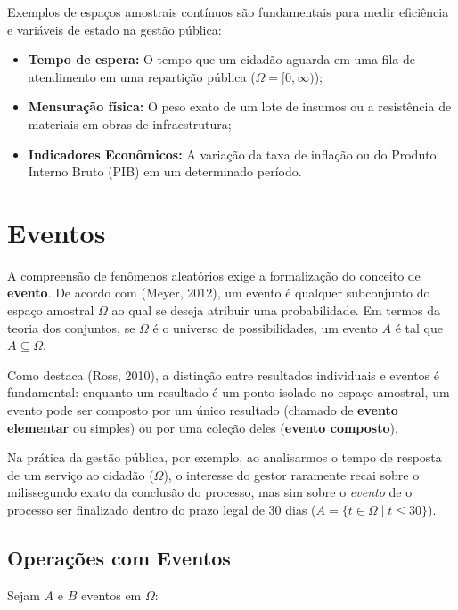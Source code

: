 Exemplos de espaços amostrais contínuos são fundamentais para medir eficiência e variáveis de estado na gestão pública:

\begin{itemize}
    \item \textbf{Tempo de espera:} O tempo que um cidadão aguarda em uma fila de atendimento em uma repartição pública ($\Omega = [0, \infty)$);
    \item \textbf{Mensuração física:} O peso exato de um lote de insumos ou a resistência de materiais em obras de infraestrutura;
    \item \textbf{Indicadores Econômicos:} A variação da taxa de inflação ou do Produto Interno Bruto (PIB) em um determinado período.
\end{itemize}



\newpage
\section{Eventos}

A compreensão de fenômenos aleatórios exige a formalização do conceito de \textbf{evento}. De acordo com (Meyer, 2012), um evento é qualquer subconjunto do espaço amostral $\Omega$ ao qual se deseja atribuir uma probabilidade. Em termos da teoria dos conjuntos, se $\Omega$ é o universo de possibilidades, um evento $A$ é tal que $A \subseteq \Omega$. \vskip0.3cm

Como destaca (Ross, 2010), a distinção entre resultados individuais e eventos é fundamental: enquanto um resultado é um ponto isolado no espaço amostral, um evento pode ser composto por um único resultado (chamado de \textbf{evento elementar} ou simples) ou por uma coleção deles (\textbf{evento composto}). \vskip0.3cm

Na prática da gestão pública, por exemplo, ao analisarmos o tempo de resposta de um serviço ao cidadão ($\Omega$), o interesse do gestor raramente recai sobre o milissegundo exato da conclusão do processo, mas sim sobre o \textit{evento} de o processo ser finalizado dentro do prazo legal de 30 dias ($A = \{t \in \Omega \mid t \leq 30\}$).




\subsection{Operações com Eventos}

Sejam $A$ e $B$ eventos em $\Omega$:

